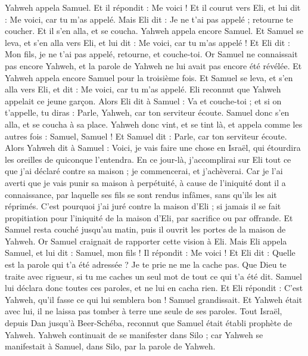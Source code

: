 \begin{multicols}{2}
Yahweh appela Samuel. Et il répondit : Me voici !
Et il courut vers Eli, et lui dit : Me voici, car tu m'as appelé. Mais Eli dit : Je ne t'ai pas appelé ; retourne te coucher. Et il s'en alla, et se coucha.
Yahweh appela encore Samuel. Et Samuel se leva, et s'en alla vers Eli, et lui dit : Me voici, car tu m'as appelé ! Et Eli dit : Mon fils, je ne t'ai pas appelé, retourne, et couche-toi.
Or Samuel ne connaissait pas encore Yahweh, et la parole de Yahweh ne lui avait pas encore été révélée.
Et Yahweh appela encore Samuel pour la troisième fois. Et Samuel se leva, et s'en alla vers Eli, et dit : Me voici, car tu m'as appelé. Eli reconnut que Yahweh appelait ce jeune garçon.
Alors Eli dit à Samuel : Va et couche-toi ; et si on t'appelle, tu diras : Parle, Yahweh, car ton serviteur écoute. Samuel donc s'en alla, et se coucha à sa place.
Yahweh donc vint, et se tint là, et appela comme les autres fois : Samuel, Samuel ! Et Samuel dit : Parle, car ton serviteur écoute.
Alors Yahweh dit à Samuel : Voici, je vais faire une chose en Israël, qui étourdira les oreilles de quiconque l'entendra.
En ce jour-là, j'accomplirai sur Eli tout ce que j'ai déclaré contre sa maison ; je commencerai, et j'achèverai.
Car je l'ai averti que je vais punir sa maison à perpétuité, à cause de l'iniquité dont il a connaissance, par laquelle ses fils se sont rendus infâmes, sans qu'ils les ait réprimés.
C'est pourquoi j'ai juré contre la maison d'Eli ; si jamais il se fait propitiation pour l'iniquité de la maison d'Eli, par sacrifice ou par offrande.
Et Samuel resta couché jusqu'au matin, puis il ouvrit les portes de la maison de Yahweh. Or Samuel craignait de rapporter cette vision à Eli.
Mais Eli appela Samuel, et lui dit : Samuel, mon fils ! Il répondit : Me voici !
Et Eli dit : Quelle est la parole qui t'a été adressée ? Je te prie ne me la cache pas. Que Dieu te traite avec rigueur, si tu me caches un seul mot de tout ce qui t'a été dit.
Samuel lui déclara donc toutes ces paroles, et ne lui en cacha rien. Et Eli répondit : C'est Yahweh, qu'il fasse ce qui lui semblera bon !
Samuel grandissait. Et Yahweh était avec lui, il ne laissa pas tomber à terre une seule de ses paroles.
Tout Israël, depuis Dan jusqu'à Beer-Schéba, reconnut que Samuel était établi prophète de Yahweh.
Yahweh continuait de se manifester dans Silo ; car Yahweh se manifestait à Samuel, dans Silo, par la parole de Yahweh.

\end{multicols}
